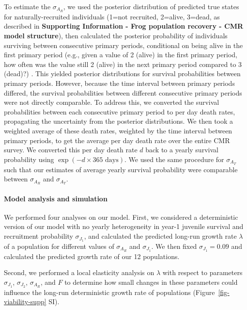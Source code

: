 \documentclass[
  letterpaper,
  DIV=11,
  numbers=noendperiod]{scrartcl}
\let\oldparagraph\paragraph
\renewcommand{\paragraph}[1]{\oldparagraph{#1}\mbox{}}
\begin{document}
To estimate the \(\sigma_{A_R}\), we used the posterior distribution of
predicted true states for naturally-recruited individuals (1=not
recruited, 2=alive, 3=dead, as described in \textbf{Supporting
Information - Frog population recovery - CMR model structure}), then
calculated the posterior probability of individuals surviving between
consecutive primary periods, conditional on being alive in the first
primary period (e.g., given a value of 2 (alive) in the first primary
period, how often was the value still 2 (alive) in the next primary
period compared to 3 (dead)?) . This yielded posterior distributions for
survival probabilities between primary periods. However, because the
time interval between primary periods differed, the survival
probabilities between different consecutive primary periods were not
directly comparable. To address this, we converted the survival
probabilities between each consecutive primary period to per day death
rates, propagating the uncertainty from the posterior distributions. We
then took a weighted average of these death rates, weighted by the time
interval between primary periods, to get the average per day death rate
over the entire CMR survey. We converted this per day death rate \(d\)
back to a yearly survival probability using
\(\exp(-d \times 365 \text{ days})\). We used the same procedure for
\(\sigma_{A_T}\) such that our estimates of average yearly survival
probability were comparable between \(\sigma_{A_R}\) and
\(\sigma_{A_T}\).

\hypertarget{model-analysis-and-simulation}{%
\paragraph{Model analysis and
simulation}\label{model-analysis-and-simulation}}

We performed four analyses on our model. First, we considered a
deterministic version of our model with no yearly heterogeneity in
year-1 juvenile survival and recruitment probability \(\sigma_{J_1}\),
and calculated the predicted long-run growth rate \(\lambda\) of a
population for different values of \(\sigma_{A_R}\) and
\(\sigma_{J_1}\). We then fixed \(\sigma_{J_1} = 0.09\) and calculated
the predicted growth rate of our 12 populations.

Second, we performed a local elasticity analysis on \(\lambda\) with
respect to parameters \(\sigma_{J_1}\), \(\sigma_{J_2}\),
\(\sigma_{A_R}\), and \(F\) to determine how small changes in these
parameters could influence the long-run deterministic growth rate of
populations (Figure~\ref{fig-viability-supp} SI).
\end{document}
